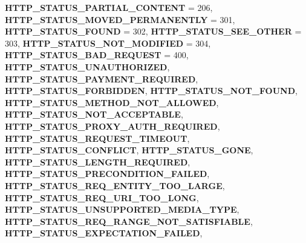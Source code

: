 \begin{DoxyCompactItemize}
{\bfseries H\+T\+T\+P\+\_\+\+S\+T\+A\+T\+U\+S\+\_\+\+P\+A\+R\+T\+I\+A\+L\+\_\+\+C\+O\+N\+T\+E\+NT} = 206, 
\newline
{\bfseries H\+T\+T\+P\+\_\+\+S\+T\+A\+T\+U\+S\+\_\+\+M\+O\+V\+E\+D\+\_\+\+P\+E\+R\+M\+A\+N\+E\+N\+T\+LY} = 301, 
{\bfseries H\+T\+T\+P\+\_\+\+S\+T\+A\+T\+U\+S\+\_\+\+F\+O\+U\+ND} = 302, 
{\bfseries H\+T\+T\+P\+\_\+\+S\+T\+A\+T\+U\+S\+\_\+\+S\+E\+E\+\_\+\+O\+T\+H\+ER} = 303, 
{\bfseries H\+T\+T\+P\+\_\+\+S\+T\+A\+T\+U\+S\+\_\+\+N\+O\+T\+\_\+\+M\+O\+D\+I\+F\+I\+ED} = 304, 
\newline
{\bfseries H\+T\+T\+P\+\_\+\+S\+T\+A\+T\+U\+S\+\_\+\+B\+A\+D\+\_\+\+R\+E\+Q\+U\+E\+ST} = 400, 
{\bfseries H\+T\+T\+P\+\_\+\+S\+T\+A\+T\+U\+S\+\_\+\+U\+N\+A\+U\+T\+H\+O\+R\+I\+Z\+ED}, 
{\bfseries H\+T\+T\+P\+\_\+\+S\+T\+A\+T\+U\+S\+\_\+\+P\+A\+Y\+M\+E\+N\+T\+\_\+\+R\+E\+Q\+U\+I\+R\+ED}, 
{\bfseries H\+T\+T\+P\+\_\+\+S\+T\+A\+T\+U\+S\+\_\+\+F\+O\+R\+B\+I\+D\+D\+EN}, 
\newline
{\bfseries H\+T\+T\+P\+\_\+\+S\+T\+A\+T\+U\+S\+\_\+\+N\+O\+T\+\_\+\+F\+O\+U\+ND}, 
{\bfseries H\+T\+T\+P\+\_\+\+S\+T\+A\+T\+U\+S\+\_\+\+M\+E\+T\+H\+O\+D\+\_\+\+N\+O\+T\+\_\+\+A\+L\+L\+O\+W\+ED}, 
{\bfseries H\+T\+T\+P\+\_\+\+S\+T\+A\+T\+U\+S\+\_\+\+N\+O\+T\+\_\+\+A\+C\+C\+E\+P\+T\+A\+B\+LE}, 
{\bfseries H\+T\+T\+P\+\_\+\+S\+T\+A\+T\+U\+S\+\_\+\+P\+R\+O\+X\+Y\+\_\+\+A\+U\+T\+H\+\_\+\+R\+E\+Q\+U\+I\+R\+ED}, 
\newline
{\bfseries H\+T\+T\+P\+\_\+\+S\+T\+A\+T\+U\+S\+\_\+\+R\+E\+Q\+U\+E\+S\+T\+\_\+\+T\+I\+M\+E\+O\+UT}, 
{\bfseries H\+T\+T\+P\+\_\+\+S\+T\+A\+T\+U\+S\+\_\+\+C\+O\+N\+F\+L\+I\+CT}, 
{\bfseries H\+T\+T\+P\+\_\+\+S\+T\+A\+T\+U\+S\+\_\+\+G\+O\+NE}, 
{\bfseries H\+T\+T\+P\+\_\+\+S\+T\+A\+T\+U\+S\+\_\+\+L\+E\+N\+G\+T\+H\+\_\+\+R\+E\+Q\+U\+I\+R\+ED}, 
\newline
{\bfseries H\+T\+T\+P\+\_\+\+S\+T\+A\+T\+U\+S\+\_\+\+P\+R\+E\+C\+O\+N\+D\+I\+T\+I\+O\+N\+\_\+\+F\+A\+I\+L\+ED}, 
{\bfseries H\+T\+T\+P\+\_\+\+S\+T\+A\+T\+U\+S\+\_\+\+R\+E\+Q\+\_\+\+E\+N\+T\+I\+T\+Y\+\_\+\+T\+O\+O\+\_\+\+L\+A\+R\+GE}, 
{\bfseries H\+T\+T\+P\+\_\+\+S\+T\+A\+T\+U\+S\+\_\+\+R\+E\+Q\+\_\+\+U\+R\+I\+\_\+\+T\+O\+O\+\_\+\+L\+O\+NG}, 
{\bfseries H\+T\+T\+P\+\_\+\+S\+T\+A\+T\+U\+S\+\_\+\+U\+N\+S\+U\+P\+P\+O\+R\+T\+E\+D\+\_\+\+M\+E\+D\+I\+A\+\_\+\+T\+Y\+PE}, 
\newline
{\bfseries H\+T\+T\+P\+\_\+\+S\+T\+A\+T\+U\+S\+\_\+\+R\+E\+Q\+\_\+\+R\+A\+N\+G\+E\+\_\+\+N\+O\+T\+\_\+\+S\+A\+T\+I\+S\+F\+I\+A\+B\+LE}, 
{\bfseries H\+T\+T\+P\+\_\+\+S\+T\+A\+T\+U\+S\+\_\+\+E\+X\+P\+E\+C\+T\+A\+T\+I\+O\+N\+\_\+\+F\+A\+I\+L\+ED}, 

\end{DoxyCompactItemize}
